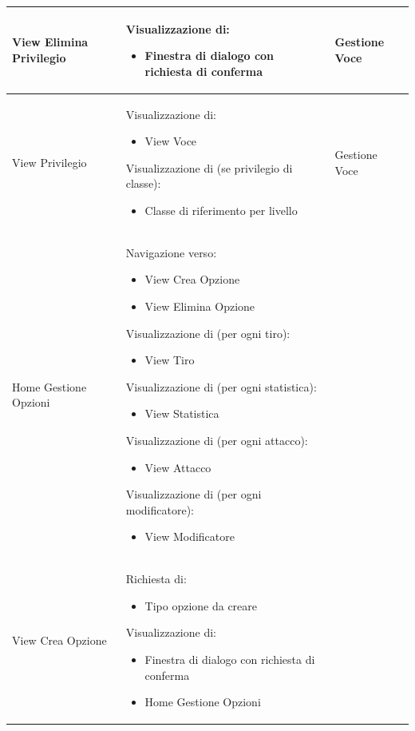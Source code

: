 \documentclass[a4paper, 11pt]{article}
\begin{document}
\begin{adjustwidth}{-1.5cm}{-1.5cm}
\begin{center}
\begin{longtable}{|p{5cm}|p{5cm}|p{5cm}|}
        View Elimina Privilegio & 
        Visualizzazione di:
        \begin{itemize}
            \item Finestra di dialogo con richiesta di conferma
        \end{itemize} & 
        Gestione Voce \\ \hline
        
        View Privilegio & 
        Visualizzazione di:
        \begin{itemize}
            \item View Voce
        \end{itemize}
        Visualizzazione di (se privilegio di classe):
        \begin{itemize}
            \item Classe di riferimento per livello
        \end{itemize} & 
        Gestione Voce \\ \hline
        
        Home Gestione Opzioni & 
        Navigazione verso:
        \begin{itemize}
            \item View Crea Opzione
            \item View Elimina Opzione
        \end{itemize}
        Visualizzazione di (per ogni tiro):
        \begin{itemize}
            \item View Tiro
        \end{itemize}
        Visualizzazione di (per ogni statistica):
        \begin{itemize}
            \item View Statistica
        \end{itemize}
        Visualizzazione di (per ogni attacco):
        \begin{itemize}
            \item View Attacco
        \end{itemize}
        Visualizzazione di (per ogni modificatore):
        \begin{itemize}
            \item View Modificatore
        \end{itemize} & 
        \\ \hline
        
        View Crea Opzione & 
        Richiesta di:
        \begin{itemize}
            \item Tipo opzione da creare
        \end{itemize}
        Visualizzazione di:
        \begin{itemize}
            \item Finestra di dialogo con richiesta di conferma
            \item Home Gestione Opzioni
        \end{itemize} & 
        \\ \hline
        

\end{longtable}
\end{center}
\end{adjustwidth}
\end{document}

